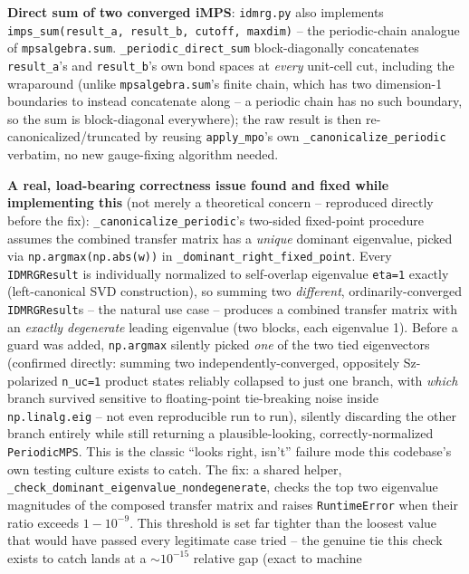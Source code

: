 \documentclass[11pt]{article}
\begin{document}
\textbf{Direct sum of two converged iMPS}: \texttt{idmrg.py} also
implements \texttt{imps\_sum(result\_a, result\_b, cutoff, maxdim)} --
the periodic-chain analogue of \texttt{mpsalgebra.sum}.
\texttt{\_periodic\_direct\_sum} block-diagonally concatenates
\texttt{result\_a}'s and \texttt{result\_b}'s own bond spaces at
\emph{every} unit-cell cut, including the wraparound (unlike
\texttt{mpsalgebra.sum}'s finite chain, which has two dimension-1
boundaries to instead concatenate along -- a periodic chain has no such
boundary, so the sum is block-diagonal everywhere); the raw result is
then re-canonicalized/truncated by reusing \texttt{apply\_mpo}'s own
\texttt{\_canonicalize\_periodic} verbatim, no new gauge-fixing algorithm
needed.

\textbf{A real, load-bearing correctness issue found and fixed while
implementing this} (not merely a theoretical concern -- reproduced
directly before the fix): \texttt{\_canonicalize\_periodic}'s two-sided
fixed-point procedure assumes the combined transfer matrix has a
\emph{unique} dominant eigenvalue, picked via
\texttt{np.argmax(np.abs(w))} in \texttt{\_dominant\_right\_fixed\_point}.
Every \texttt{IDMRGResult} is individually normalized to self-overlap
eigenvalue \texttt{eta=1} exactly (left-canonical SVD construction), so
summing two \emph{different}, ordinarily-converged \texttt{IDMRGResult}s
-- the natural use case -- produces a combined transfer matrix with an
\emph{exactly degenerate} leading eigenvalue (two blocks, each eigenvalue
1). Before a guard was added, \texttt{np.argmax} silently picked
\emph{one} of the two tied eigenvectors (confirmed directly: summing two
independently-converged, oppositely Sz-polarized \texttt{n\_uc=1} product
states reliably collapsed to just one branch, with \emph{which} branch
survived sensitive to floating-point tie-breaking noise inside
\texttt{np.linalg.eig} -- not even reproducible run to run), silently
discarding the other branch entirely while still returning a
plausible-looking, correctly-normalized \texttt{PeriodicMPS}. This is the
classic ``looks right, isn't'' failure mode this codebase's own testing
culture exists to catch. The fix: a shared helper,
\texttt{\_check\_dominant\_eigenvalue\_nondegenerate}, checks the top two
eigenvalue magnitudes of the composed transfer matrix and raises
\texttt{RuntimeError} when their ratio exceeds $1-10^{-9}$. This
threshold is set far tighter than the loosest value that would have
passed every legitimate case tried -- the genuine tie this check exists
to catch lands at a $\sim 10^{-15}$ relative gap (exact to machine
\end{document}

